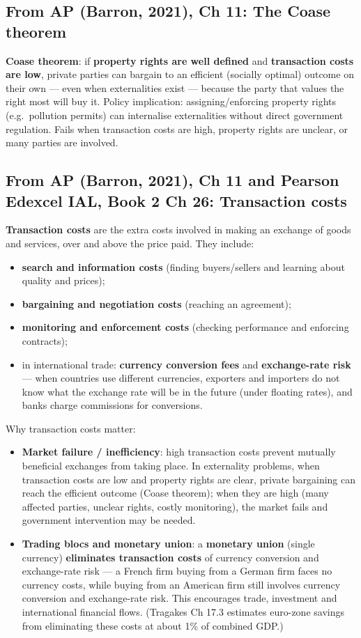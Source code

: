 \documentclass[a4paper,12pt]{article}
\newcommand{\needbold}[1]{\textcolor{red!70!black}{\textbf{#1}}}
\begin{document}
\subsection*{From AP (Barron, 2021), Ch 11: The Coase theorem}
\needbold{Coase theorem}: if \textbf{property rights are well defined} and \textbf{transaction costs are low}, private parties can bargain to an efficient (socially optimal) outcome on their own --- even when externalities exist --- because the party that values the right most will buy it. Policy implication: assigning/enforcing property rights (e.g.\ pollution permits) can internalise externalities without direct government regulation. Fails when transaction costs are high, property rights are unclear, or many parties are involved.

\subsection*{From AP (Barron, 2021), Ch 11 and Pearson Edexcel IAL, Book 2 Ch 26: Transaction costs}\label{sec:add-transaction}
\needbold{Transaction costs} are the extra costs involved in making an exchange of goods and services, over and above the price paid. They include:
\begin{itemize}
  \item \textbf{search and information costs} (finding buyers/sellers and learning about quality and prices);
  \item \textbf{bargaining and negotiation costs} (reaching an agreement);
  \item \textbf{monitoring and enforcement costs} (checking performance and enforcing contracts);
  \item in international trade: \textbf{currency conversion fees} and \textbf{exchange-rate risk} --- when countries use different currencies, exporters and importers do not know what the exchange rate will be in the future (under floating rates), and banks charge commissions for conversions.
\end{itemize}
Why transaction costs matter:
\begin{itemize}
  \item \textbf{Market failure / inefficiency}: high transaction costs prevent mutually beneficial exchanges from taking place. In externality problems, when transaction costs are low and property rights are clear, private bargaining can reach the efficient outcome (Coase theorem); when they are high (many affected parties, unclear rights, costly monitoring), the market fails and government intervention may be needed.
  \item \textbf{Trading blocs and monetary union}: a \textbf{monetary union} (single currency) \textbf{eliminates transaction costs} of currency conversion and exchange-rate risk --- a French firm buying from a German firm faces no currency costs, while buying from an American firm still involves currency conversion and exchange-rate risk. This encourages trade, investment and international financial flows. (Tragakes Ch 17.3 estimates euro-zone savings from eliminating these costs at about 1\% of combined GDP.)
\end{itemize}
\end{document}
